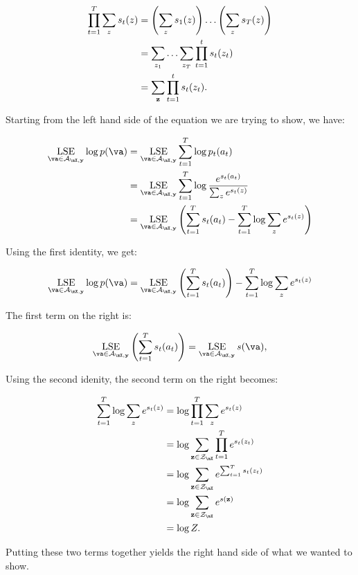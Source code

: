 \begin{align*}
\prod_{t=1}^T \sum_{z} s_t(z) &= \left(\sum_{z} s_1(z)\right) \ldots \left(\sum_{z} s_T(z)\right) \\
&= \sum_{z_1} \ldots \sum_{z_T} \prod_{t=1}^t s_t(z_t) \\
&= \sum_{{\bf z}}\prod_{t=1}^t s_t(z_t).
\end{align*}

Starting from the left hand side of the equation we are trying to show, we have:

\begin{align*}
\LSE_{\va \in \gA_{\mX, \vy}} \log p(\va) &= \LSE_{\va \in \gA_{\mX, \vy}} \sum_{t=1}^T \log p_t(a_t) \\
&= \LSE_{\va \in \gA_{\mX, \vy}} \sum_{t=1}^T \log \frac{e^{s_t(a_t)}}{\sum_z e^{s_t(z)}} \\
&= \LSE_{\va \in \gA_{\mX, \vy}} \left( \sum_{t=1}^T s_t(a_t) - \sum_{t=1}^T \log \sum_z e^{s_t(z)} \right)\\
\end{align*}

Using the first identity, we get:

\begin{align*}
\LSE_{\va \in \gA_{\mX, \vy}} \log p(\va) &= \LSE_{\va \in \gA_{\mX, \vy}} \left( \sum_{t=1}^T s_t(a_t)\right) - \sum_{t=1}^T \log \sum_z e^{s_t(z)} \\
\end{align*}

The first term on the right is:

$$
\LSE_{\va \in \gA_{\mX, \vy}} \left( \sum_{t=1}^T s_t(a_t)\right) = \LSE_{\va \in \gA_{\mX, \vy}} s(\va),
$$

Using the second idenity, the second term on the right becomes:

\begin{align*}
\sum_{t=1}^T \log \sum_z e^{s_t(z)} &= \log \prod_{t=1}^T \sum_z e^{s_t(z)} \\
&= \log \sum_{\vz \in \mathcal{\gZ_\mX}} \prod_{t=1}^T e^{s_t(z_t)} \\
&= \log \sum_{\vz \in \mathcal{\gZ_\mX}} e^{\sum_{t=1}^T s_t(z_t)} \\
&= \log \sum_{\vz \in \mathcal{\gZ_\mX}} e^{s(\vz)} \\
&= \log Z.
\end{align*}

Putting these two terms together yields the right hand side of what we wanted to show.


